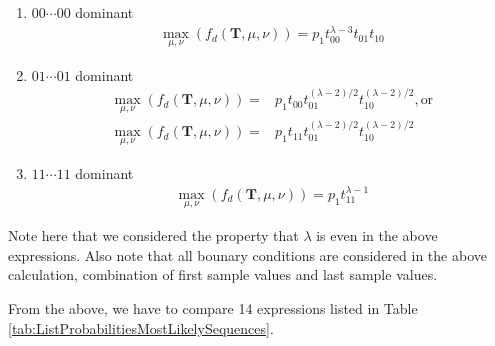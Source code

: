 ﻿\documentclass[a3paper,xelatex,english]{bxjsarticle}
\newcommand\mib[1]{\boldsymbol{#1}}
\begin{document}
\begin{enumerate}[{d)}-i)]
	\item $00 \cdots 00$ dominant 
	\begin{align}
	\max_{\mu, \nu}(f_{d}(\mib{T}, \mu, \nu)) = p_{1} t_{00}^{\lambda - 3} t_{01} t_{10} \label{expression:neg4}
	\end{align}
	\item $01 \cdots 01$ dominant 
	\begin{align}
	\max_{\mu, \nu}(f_{d}(\mib{T}, \mu, \nu)) = & p_{1} t_{00} t_{01}^{(\lambda - 2) / 2} t_{10}^{(\lambda - 2) / 2}, {\textrm{or}} \\
	\max_{\mu, \nu}(f_{d}(\mib{T}, \mu, \nu)) = & p_{1} t_{11} t_{01}^{(\lambda - 2) / 2} t_{10}^{(\lambda - 2) / 2}
	\end{align}
	\item $11 \cdots 11$ dominant 
	\begin{align}
	\max_{\mu, \nu}(f_{d}(\mib{T}, \mu, \nu)) = p_{1} t_{11}^{\lambda - 1}
	\end{align}
\end{enumerate}
Note here that we considered the property that $\lambda$ is even in the above expressions.
Also note that all bounary conditions are considered in the above calculation, combination of first sample values and last sample values.


From the above, we have to compare 14 expressions listed in Table \ref{tab:ListProbabilitiesMostLikelySequences}.
\end{document}
